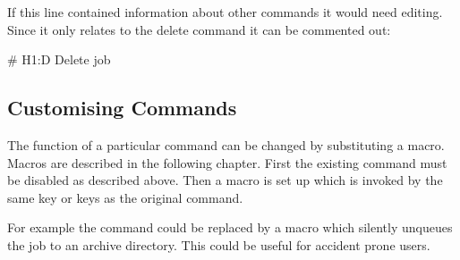 If this line contained information about other commands it would need
editing. Since it only relates to the delete command it can be
commented out:

\begin{expara}

\# H1:D Delete job

\end{expara}

\subsection{Customising Commands}
The function of a particular command can be changed by substituting a
macro. Macros are described in the following chapter. First
the existing command must be disabled as described above. Then a macro
is set up which is invoked by the same key or keys as the original
command.

For example the  command could be replaced
by a macro which silently unqueues the job to an archive directory.
This could be useful for accident prone users.

